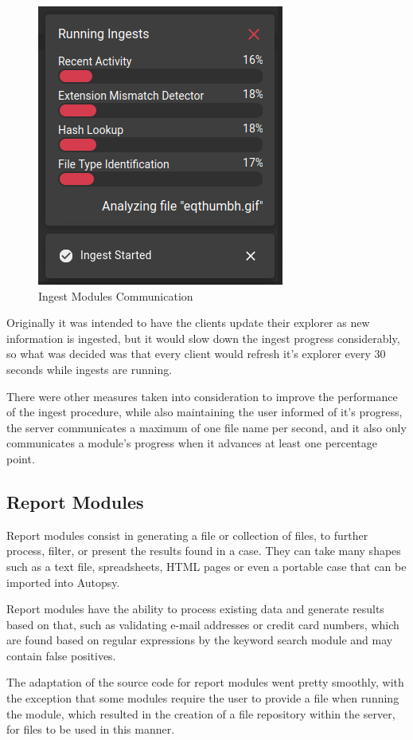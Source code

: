 \begin{figure}[ht]
 \centering
 \includegraphics[width=0.55\linewidth]{imgs/modules.png}
 \caption{Ingest Modules Communication}
 \label{fig:modules}
\end{figure}

Originally it was intended to have the clients update their explorer as new information is ingested, but it would slow down the ingest progress considerably, so what was decided was that every client would refresh 
it's explorer every 30 seconds while ingests are running.

There were other measures taken into consideration to improve the performance of the ingest procedure, while also maintaining the user informed of it's progress, the server communicates a maximum of one file name per
second, and it also only communicates a module's progress when it advances at least one percentage point.

\subsection{Report Modules}

Report modules consist in generating a file or collection of files, to further process, filter, or present the results found in a case. They can take many shapes such as a text file, spreadsheets, HTML pages or even a portable case that can be imported into Autopsy.

Report modules have the ability to process existing data and generate results based on that, such as validating e-mail addresses or credit card numbers, 
which are found based on regular expressions by the keyword search module and may contain false positives.

The adaptation of the source code for report modules went pretty smoothly, with the exception that some modules require the user to provide a file when running the module, which resulted in the creation of a file repository within the server, for files to be used in this manner.

